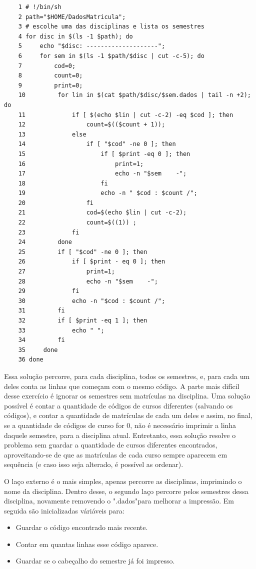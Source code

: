 \documentclass[oneside, 11 pt]{article}
\begin{document}
	\begin{lstlisting}
	1 # !/bin/sh
	2 path="$HOME/DadosMatricula";
	3 # escolhe uma das disciplinas e lista os semestres
	4 for disc in $(ls -1 $path); do
	5     echo "$disc: --------------------";
	6     for sem in $(ls -1 $path/$disc | cut -c-5); do
	7         cod=0;
	8         count=0;
	9         print=0;
	10         for lin in $(cat $path/$disc/$sem.dados | tail -n +2); do
	11             if [ $(echo $lin | cut -c-2) -eq $cod ]; then
	12                 count=$(($count + 1));
	13             else
	14                 if [ "$cod" -ne 0 ]; then
	15                     if [ $print -eq 0 ]; then
	16                         print=1;
	17                         echo -n "$sem    -";
	18                     fi
	19                     echo -n " $cod : $count /";
	20                 fi
	21                 cod=$(echo $lin | cut -c-2);
	22                 count=$((1)) ;
	23             fi
	24         done
	25         if [ "$cod" -ne 0 ]; then
	26             if [ $print - eq 0 ]; then
	27                 print=1;
	28                 echo -n "$sem    -";
	29             fi
	30             echo -n "$cod : $count /";
	31         fi
	32         if [ $print -eq 1 ]; then
	33             echo " ";
	34         fi
	35     done
	36 done
	\end{lstlisting}
	
	Essa solução percorre, para cada disciplina, todos os semestres, e, para cada um deles conta as linhas que começam com o mesmo código. A parte mais difícil desse exercício é ignorar os semestres sem matrículas na disciplina. Uma solução possível é contar a quantidade de códigos de cursos diferentes (salvando os códigos), e contar a quantidade de matrículas de cada um deles e assim, no final, se a quantidade de códigos de curso for 0, não é necessário imprimir a linha daquele semestre, para a disciplina atual. Entretanto, essa solução resolve o problema sem guardar a quantidade de cursos diferentes encontrados, aproveitando-se de que as matrículas de cada curso sempre aparecem em sequência (e caso isso seja alterado, é possível as ordenar).
	
	O laço externo é o mais simples, apenas percorre as disciplinas, imprimindo o nome da disciplina. Dentro desse, o segundo laço percorre pelos semestres dessa disciplina, novamente removendo o ".dados"para melhorar a impressão. Em seguida são inicializadas váriáveis para:
	
	\begin{itemize}
		\item Guardar o código encontrado mais recente.
		\item Contar em quantas linhas esse código aparece.
		\item Guardar se o cabeçalho do semestre já foi impresso.
	\end{itemize}
	
\end{document}
